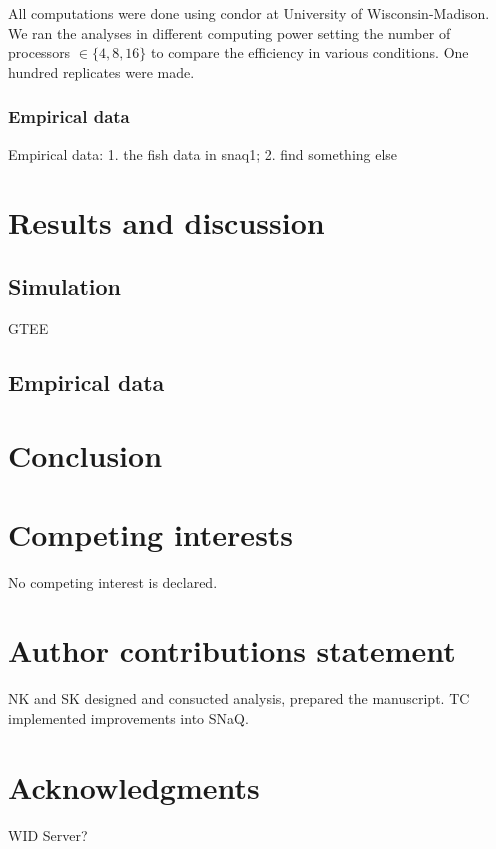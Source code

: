 \documentclass[unnumsec,webpdf,contemporary,large]{oup-authoring-template}%
\theoremstyle{thmstyleone}%
\theoremstyle{thmstyletwo}%
\theoremstyle{thmstylethree}%
\begin{document}
All computations were done using condor at University of Wisconsin-Madison. We ran the analyses in different computing power setting the number of processors $\in\{4,8,16\}$ to compare the efficiency in various conditions. One hundred replicates were made.



\subsubsection{Empirical data}

Empirical data: 1. the fish data in snaq1; 2. find something else

\section{Results and discussion}\label{sec3}
\subsection{Simulation}\label{subsec4}
GTEE
\subsection{Empirical data}\label{subsec5}

\section{Conclusion}\label{sec4}

\section{Competing interests}
No competing interest is declared.

\section{Author contributions statement}
NK and SK designed and consucted analysis, prepared the manuscript. TC implemented improvements into SNaQ. 

\section{Acknowledgments}
WID Server? 

%
%
%
%
\end{document}
